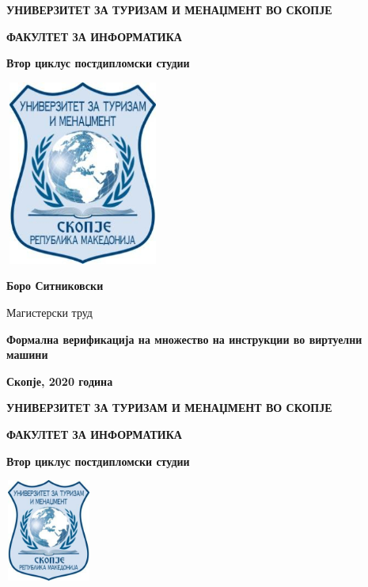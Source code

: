 \setlength{\parskip}{0.14in}

\begin{center}

\textbf{УНИВЕРЗИТЕТ ЗА ТУРИЗАМ И МЕНАЏМЕНТ ВО СКОПЈЕ}

\textbf{ФАКУЛТЕТ ЗА ИНФОРМАТИКА}

\textbf{Втор циклус постдипломски студии}

\bigbreak

\includegraphics[width=2.01042in,height=2.38542in]{images/utms.jpg}

\vspace{5em}

\textbf{Боро Ситниковски}

Магистерски труд

\textbf{Формална верификација на множество на инструкции во виртуелни машини}

\vspace*{\fill}

\textbf{Скопје, 2020 година}

\newpage{}

\textbf{УНИВЕРЗИТЕТ ЗА ТУРИЗАМ И МЕНАЏМЕНТ ВО СКОПЈЕ}

\textbf{ФАКУЛТЕТ ЗА ИНФОРМАТИКА}

\textbf{Втор циклус постдипломски студии}

\bigbreak

\includegraphics[width=1.11458in,height=1.32292in]{images/utms.jpg}

\end{center}

